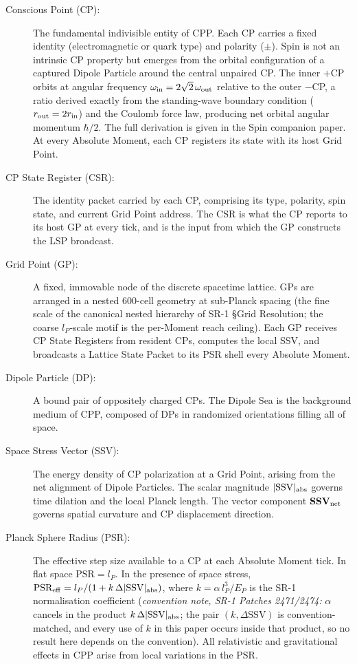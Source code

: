 \documentclass[12pt]{article}
\newcommand{\SSV}{\text{SSV}}
\newcommand{\PSR}{\text{PSR}}
\begin{document}
\begin{description}

\item[Conscious Point (CP):] The fundamental indivisible entity of
  CPP. Each CP carries a fixed identity (electromagnetic or quark
  type) and polarity ($\pm$). Spin is not an intrinsic CP property
  but emerges from the orbital configuration of a captured Dipole
  Particle around the central unpaired CP. The inner $+$CP orbits
  at angular frequency $\omega_{\rm in} = 2\sqrt{2}\,\omega_{\rm out}$
  relative to the outer $-$CP, a ratio derived exactly from the
  standing-wave boundary condition ($r_{\rm out} = 2r_{\rm in}$) and
  the Coulomb force law, producing net orbital angular momentum
  $\hbar/2$. The full derivation is given in the Spin companion paper.
  At every Absolute Moment, each CP registers its state with its
  host Grid Point.

\item[CP State Register (CSR):] The identity packet carried by each
  CP, comprising its type, polarity, spin state, and current Grid
  Point address. The CSR is what the CP reports to its host GP at
  every tick, and is the input from which the GP constructs the LSP
  broadcast.

\item[Grid Point (GP):] A fixed, immovable node of the discrete
  spacetime lattice. GPs are arranged in a nested 600-cell geometry
  at sub-Planck spacing (the fine scale of the canonical nested
  hierarchy of SR-1 \S Grid Resolution; the coarse $l_P$-scale motif
  is the per-Moment reach ceiling). Each GP receives CP State Registers from
  resident CPs, computes the local SSV, and broadcasts a Lattice
  State Packet to its PSR shell every Absolute Moment.

\item[Dipole Particle (DP):] A bound pair of oppositely charged CPs.
  The Dipole Sea is the background medium of CPP, composed of DPs
  in randomized orientations filling all of space.

\item[Space Stress Vector (SSV):] The energy density of CP
  polarization at a Grid Point, arising from the net alignment of
  Dipole Particles. The scalar magnitude $|\SSV|_{\rm abs}$ governs
  time dilation and the local Planck length. The vector component
  $\mathbf{SSV}_{\rm net}$ governs spatial curvature and CP
  displacement direction.

\item[Planck Sphere Radius (PSR):] The effective step size available
  to a CP at each Absolute Moment tick. In flat space
  $\PSR = l_P$. In the presence of space stress,
  $\PSR_{\rm eff} = l_P / (1 + k\,\Delta|\SSV|_{\rm abs})$,
  where $k = \alpha\, l_P^3/E_P$ is the SR-1 normalisation coefficient
  (\emph{convention note, SR-1 Patches 2471/2474:} $\alpha$ cancels in the
  product $k\,\Delta|\SSV|_{\rm abs}$; the pair $(k,\Delta\text{SSV})$ is
  convention-matched, and every use of $k$ in this paper occurs inside that
  product, so no result here depends on the convention). All
  relativistic and gravitational effects in CPP arise from local
  variations in the PSR.


\end{description}
\end{document}
